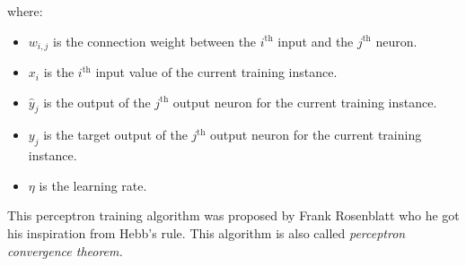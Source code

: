 where:
\begin{itemize}
    \item $w_{i,j}$ is the connection weight between the $i^\text{th}$ input and the $j^\text{th}$ neuron.
    \item $x_i$ is the $i^\text{th}$ input value of the current training instance. 
    \item $\hat{y}_j$ is the output of the $j^\text{th}$ output neuron for the current training instance. 
    \item $y_j$ is the target output of the $j^\text{th}$ output neuron for the current training instance. 
    \item $\eta$ is the learning rate. 
\end{itemize}

This perceptron training algorithm was proposed by Frank Rosenblatt who he got his inspiration from Hebb's rule. This algorithm is also called \textit{perceptron convergence theorem.}